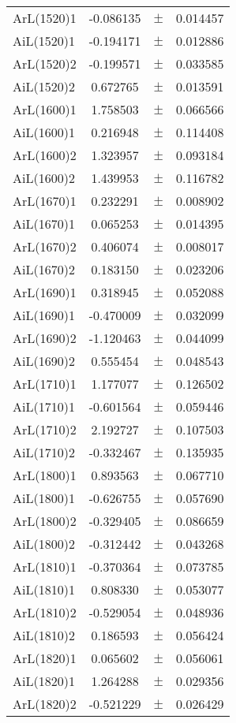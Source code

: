 \begin{table}
\begin{tiny}
\begin{tabular}{lccc}
ArL(1520)1 & -0.086135 & $\pm$ & 0.014457 \\
AiL(1520)1 & -0.194171 & $\pm$ & 0.012886 \\
ArL(1520)2 & -0.199571 & $\pm$ & 0.033585 \\
AiL(1520)2 & 0.672765 & $\pm$ & 0.013591 \\
ArL(1600)1 & 1.758503 & $\pm$ & 0.066566 \\
AiL(1600)1 & 0.216948 & $\pm$ & 0.114408 \\
ArL(1600)2 & 1.323957 & $\pm$ & 0.093184 \\
AiL(1600)2 & 1.439953 & $\pm$ & 0.116782 \\
ArL(1670)1 & 0.232291 & $\pm$ & 0.008902 \\
AiL(1670)1 & 0.065253 & $\pm$ & 0.014395 \\
ArL(1670)2 & 0.406074 & $\pm$ & 0.008017 \\
AiL(1670)2 & 0.183150 & $\pm$ & 0.023206 \\
ArL(1690)1 & 0.318945 & $\pm$ & 0.052088 \\
AiL(1690)1 & -0.470009 & $\pm$ & 0.032099 \\
ArL(1690)2 & -1.120463 & $\pm$ & 0.044099 \\
AiL(1690)2 & 0.555454 & $\pm$ & 0.048543 \\
ArL(1710)1 & 1.177077 & $\pm$ & 0.126502 \\
AiL(1710)1 & -0.601564 & $\pm$ & 0.059446 \\
ArL(1710)2 & 2.192727 & $\pm$ & 0.107503 \\
AiL(1710)2 & -0.332467 & $\pm$ & 0.135935 \\
ArL(1800)1 & 0.893563 & $\pm$ & 0.067710 \\
AiL(1800)1 & -0.626755 & $\pm$ & 0.057690 \\
ArL(1800)2 & -0.329405 & $\pm$ & 0.086659 \\
AiL(1800)2 & -0.312442 & $\pm$ & 0.043268 \\
ArL(1810)1 & -0.370364 & $\pm$ & 0.073785 \\
AiL(1810)1 & 0.808330 & $\pm$ & 0.053077 \\
ArL(1810)2 & -0.529054 & $\pm$ & 0.048936 \\
AiL(1810)2 & 0.186593 & $\pm$ & 0.056424 \\
ArL(1820)1 & 0.065602 & $\pm$ & 0.056061 \\
AiL(1820)1 & 1.264288 & $\pm$ & 0.029356 \\
ArL(1820)2 & -0.521229 & $\pm$ & 0.026429 \\

\end{tabular}
\end{tiny}
\end{table}
